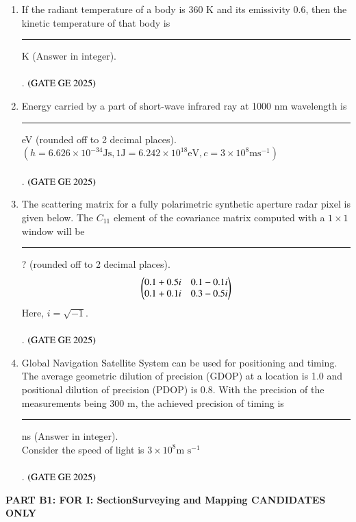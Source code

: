 \documentclass[journal,12pt,onecolumn]{IEEEtran}
\theoremstyle{remark}
\begin{document}
\begin{enumerate}
\bigskip
\item If the radiant temperature of a body is 360 K and its emissivity 0.6, then the kinetic temperature of that body is \rule{2cm}{0.5mm} K (Answer in integer).
\\
\\.
\hfill $\left(\text{GATE GE 2025}\right)$
\bigskip
\item Energy carried by a part of short-wave infrared ray at 1000 nm wavelength is \rule{2cm}{0.5mm} eV (rounded off to 2 decimal places).
\\
$(h = 6.626 \times 10^{-34}  \text{J}  \text{s},  1  \text{J} = 6.242 \times 10^{18}  \text{eV},  c = 3 \times 10^8  \text{m}  \text{s}^{-1})$
\\
\\.
\hfill $\left(\text{GATE GE 2025}\right)$
\bigskip
\item The scattering matrix for a fully polarimetric synthetic aperture radar pixel is given below. The $C_{11}$ element of the covariance matrix computed with a $1 \times 1$ window will be \rule{2cm}{0.5mm}? (rounded off to 2 decimal places).
\[
\begin{pmatrix}
0.1 + 0.5i & 0.1 - 0.1i \\
0.1 + 0.1i & 0.3 - 0.5i
\end{pmatrix}
\]
Here, $i = \sqrt{-1}$.
\\
\\.
\hfill $\left(\text{GATE GE 2025}\right)$
\bigskip
\item Global Navigation Satellite System can be used for positioning and timing. The average geometric dilution of precision (GDOP) at a location is 1.0 and positional dilution of precision (PDOP) is 0.8. With the precision of the measurements being 300 m, the achieved precision of timing is \rule{2cm}{0.5mm} ns (Answer in integer).
\\
Consider the speed of light is $3 \times 10^8  \text{m s}^{-1}$
\\
\\.
\hfill $\left(\text{GATE GE 2025}\right)$
\bigskip
\end{enumerate}

\textbf{PART B1: FOR  I: SectionSurveying and Mapping CANDIDATES ONLY}\\
\end{document}
